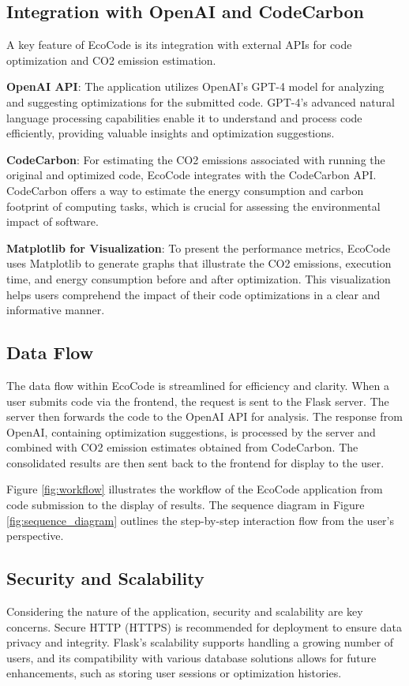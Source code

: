 \documentclass[conference,compsoc]{IEEEtran}
\begin{document}
\subsection{Integration with OpenAI and CodeCarbon}
A key feature of EcoCode is its integration with external APIs for code optimization and CO2 emission estimation.

\textbf{OpenAI API}: The application utilizes OpenAI's GPT-4 model for analyzing and suggesting optimizations for the submitted code. GPT-4's advanced natural language processing capabilities enable it to understand and process code efficiently, providing valuable insights and optimization suggestions.

\textbf{CodeCarbon}: For estimating the CO2 emissions associated with running the original and optimized code, EcoCode integrates with the CodeCarbon API. CodeCarbon offers a way to estimate the energy consumption and carbon footprint of computing tasks, which is crucial for assessing the environmental impact of software.

\textbf{Matplotlib for Visualization}: To present the performance metrics, EcoCode uses Matplotlib to generate graphs that illustrate the CO2 emissions, execution time, and energy consumption before and after optimization. This visualization helps users comprehend the impact of their code optimizations in a clear and informative manner.

\subsection{Data Flow}
The data flow within EcoCode is streamlined for efficiency and clarity. When a user submits code via the frontend, the request is sent to the Flask server. The server then forwards the code to the OpenAI API for analysis. The response from OpenAI, containing optimization suggestions, is processed by the server and combined with CO2 emission estimates obtained from CodeCarbon. The consolidated results are then sent back to the frontend for display to the user.

Figure \ref{fig:workflow} illustrates the workflow of the EcoCode application from code submission to the display of results. The sequence diagram in Figure \ref{fig:sequence_diagram} outlines the step-by-step interaction flow from the user's perspective.

\subsection{Security and Scalability}
Considering the nature of the application, security and scalability are key concerns. Secure HTTP (HTTPS) is recommended for deployment to ensure data privacy and integrity. Flask's scalability supports handling a growing number of users, and its compatibility with various database solutions allows for future enhancements, such as storing user sessions or optimization histories.
\end{document}
